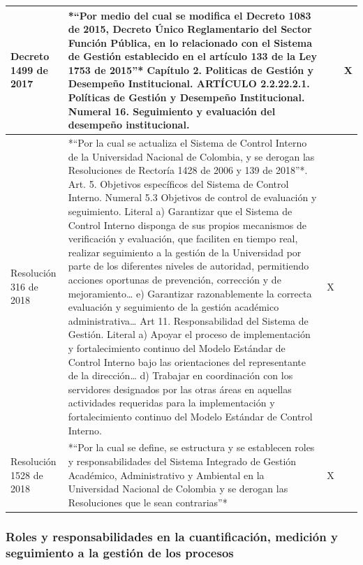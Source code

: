 \documentclass[
]{book}
\begin{document}
\begin{table}
\begin{tabular}[t]{l|l|l|l}
\hline
Decreto 1499 de 2017 & *“Por medio del cual se modifica el Decreto 1083 de 2015, Decreto Único Reglamentario del Sector Función Pública, en lo relacionado con el Sistema de Gestión establecido en el artículo 133 de la Ley 1753 de 2015”* Capítulo 2. Politicas de Gestión y Desempeño Institucional. ARTÍCULO  2.2.22.2.1. Políticas de Gestión y Desempeño Institucional. Numeral 16. Seguimiento y evaluación del desempeño institucional. &  & X\\
\hline
Resolución 316 de 2018 & *“Por la cual se actualiza el Sistema de Control Interno de la Universidad Nacional de Colombia, y se derogan las Resoluciones de Rectoría 1428 de 2006 y 139 de 2018”*. Art. 5. Objetivos específicos del Sistema de Control Interno. Numeral 5.3 Objetivos de control de evaluación y seguimiento. Literal  a) Garantizar que el Sistema de Control Interno disponga de sus propios mecanismos de verificación y evaluación, que faciliten en tiempo real, realizar seguimiento a la gestión de la Universidad por parte de los diferentes niveles de autoridad, permitiendo acciones oportunas de prevención, corrección y de mejoramiento… e) Garantizar razonablemente la correcta evaluación y seguimiento de la gestión académico administrativa… Art 11. Responsabilidad del Sistema de Gestión. Literal a) Apoyar el proceso de implementación y fortalecimiento continuo del Modelo Estándar de Control Interno bajo las orientaciones del representante de la dirección… d) Trabajar en coordinación con los servidores designados por las otras áreas en aquellas actividades requeridas para la implementación y fortalecimiento continuo del Modelo Estándar de Control Interno. & X & \\
\hline
Resolución 1528 de 2018 & *“Por la cual se define, se estructura y se establecen roles y responsabilidades del Sistema Integrado de Gestión Académico, Administrativo y Ambiental en la Universidad Nacional de Colombia y se derogan las Resoluciones que le sean contrarias”* & X & \\
\hline
\end{tabular}
\end{table}

\hypertarget{roles-y-responsabilidades-en-la-cuantificaciuxf3n-mediciuxf3n-y-seguimiento-a-la-gestiuxf3n-de-los-procesos}{%
\subsubsection{Roles y responsabilidades en la cuantificación, medición y seguimiento a la gestión de los procesos}\label{roles-y-responsabilidades-en-la-cuantificaciuxf3n-mediciuxf3n-y-seguimiento-a-la-gestiuxf3n-de-los-procesos}}
\end{document}
